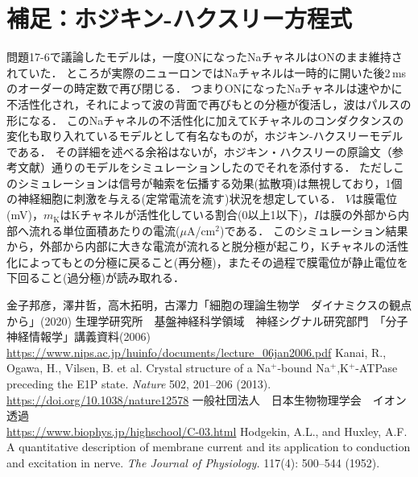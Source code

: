 \documentclass[a4paper,11pt]{jsarticle}
\begin{document}
\section{補足：ホジキン-ハクスリー方程式}
問題17-6で議論したモデルは，一度ONになったNaチャネルはONのまま維持されていた．
ところが実際のニューロンではNaチャネルは一時的に開いた後2\,msのオーダーの時定数で再び閉じる．
つまりONになったNaチャネルは速やかに不活性化され，それによって波の背面で再びもとの分極が復活し，波はパルスの形になる．
このNaチャネルの不活性化に加えてKチャネルのコンダクタンスの変化も取り入れているモデルとして有名なものが，ホジキン-ハクスリーモデルである．
その詳細を述べる余裕はないが，ホジキン・ハクスリーの原論文（参考文献\cite{hh}）通りのモデルをシミュレーションしたのでそれを添付する．
ただしこのシミュレーションは信号が軸索を伝播する効果(拡散項)は無視しており，1個の神経細胞に刺激を与える(定常電流を流す)状況を想定している．
$V$は膜電位(mV)，$m_{\mathrm{K}}$はKチャネルが活性化している割合(0以上1以下)，$I$は膜の外部から内部へ流れる単位面積あたりの電流($\mu$A/cm$^{2}$)である．
このシミュレーション結果から，外部から内部に大きな電流が流れると脱分極が起こり，Kチャネルの活性化によってもとの分極に戻ること(再分極)，またその過程で膜電位が静止電位を下回ること(過分極)が読み取れる．

\begin{thebibliography}{99}
    金子邦彦，澤井哲，高木拓明，古澤力「細胞の理論生物学　ダイナミクスの観点から」(2020)
    生理学研究所　基盤神経科学領域　神経シグナル研究部門　「分子神経情報学」講義資料(2006) \\
    \url{https://www.nips.ac.jp/huinfo/documents/lecture_06jan2006.pdf}
    Kanai, R., Ogawa, H., Vilsen, B. et al. Crystal structure of a Na$^+$-bound Na$^+$,K$^+$-ATPase preceding the E1P state. \textit{Nature} 502, 201–206 (2013). \\
    \url{https://doi.org/10.1038/nature12578} 
    一般社団法人　日本生物物理学会　イオン透過 \\
    \url{https://www.biophys.jp/highschool/C-03.html}
    Hodgekin, A.L., and Huxley, A.F. 
    A quantitative description of membrane current and its application to conduction and excitation in nerve. 
    \textit{The Journal of Physiology.} 117(4): 500–544 (1952).
\end{thebibliography}
\end{document}
